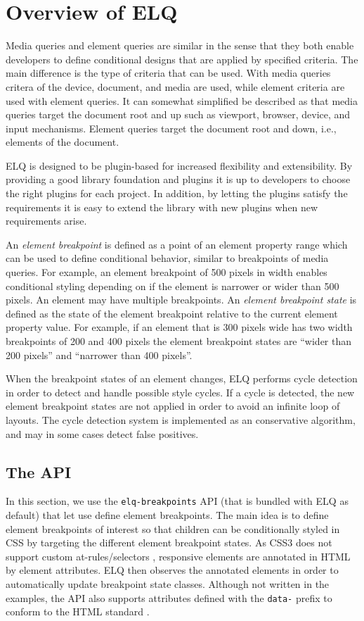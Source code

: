 \documentclass{acm_proc_article-sp}
\newcommand{\code}[1]{\texttt{#1}}
\newcommand{\elq}{ELQ}
\begin{document}
\section{Overview of \elq{}}\label{sec:elq}
  Media queries and element queries are similar in the sense that they both enable developers to define conditional designs that are applied by specified criteria.
  The main difference is the type of criteria that can be used.
  With media queries critera of the device, document, and media are used, while element criteria are used with element queries.
  It can somewhat simplified be described as that media queries target the document root and up such as viewport, browser, device, and input mechanisms.
  Element queries target the document root and down, i.e., elements of the document.

  \elq{} is designed to be plugin-based for increased flexibility and extensibility.
  By providing a good library foundation and plugins it is up to developers to choose the right plugins for each project.
  In addition, by letting the plugins satisfy the requirements it is easy to extend the library with new plugins when new requirements arise.

  An \emph{element breakpoint} is defined as a point of an element property range which can be used to define conditional behavior, similar to breakpoints of media queries.
  For example, an element breakpoint of 500 pixels in width enables conditional styling depending on if the element is narrower or wider than 500 pixels.
  An element may have multiple breakpoints.
  An \emph{element breakpoint state} is defined as the state of the element breakpoint relative to the current element property value.
  For example, if an element that is 300 pixels wide has two width breakpoints of 200 and 400 pixels the element breakpoint states are ``wider than 200 pixels'' and ``narrower than 400 pixels''.

  When the breakpoint states of an element changes, \elq{} performs cycle detection in order to detect and handle possible style cycles.
  If a cycle is detected, the new element breakpoint states are not applied in order to avoid an infinite loop of layouts.
  The cycle detection system is implemented as an conservative algorithm, and may in some cases detect false positives.

  \subsection{The API}\label{sec:elq-api}
    In this section, we use the \code{elq-breakpoints} API (that is bundled with \elq{} as default) that let use define element breakpoints.
    The main idea is to define element breakpoints of interest so that children can be conditionally styled in CSS by targeting the different element breakpoint states.
    As CSS3 does not support custom at-rules/selectors \cite{w3c_css_selectors}, responsive elements are annotated in HTML by element attributes.
    \elq{} then observes the annotated elements in order to automatically update breakpoint state classes.
    Although not written in the examples, the API also supports attributes defined with the \code{data-} prefix to conform to the HTML standard \cite{html-spec}.
\end{document}
